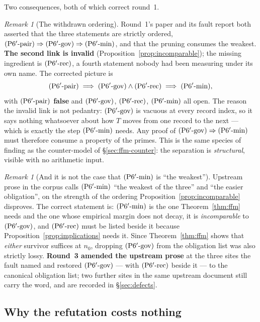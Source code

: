 \documentclass[11pt,a4paper]{article}
\theoremstyle{plain}
\theoremstyle{definition}
\theoremstyle{remark}
\newtheorem{remark}[theorem]{Remark}
\newcommand{\Ppair}{\textup{(P6$'$-pair)}}
\newcommand{\Pgov}{\textup{(P6$'$-gov)}}
\newcommand{\Pmin}{\textup{(P6$'$-min)}}
\newcommand{\Prec}{\textup{(P6$'$-rec)}}
\begin{document}
Two consequences, both of which correct round~1.

\begin{remark}[The withdrawn ordering]
\label{rem:withdrawn}
Round~1's paper and its fault report both asserted that the three statements are strictly
ordered, $\Ppair \Rightarrow \Pgov \Rightarrow \Pmin$, and that the pruning consumes the
weakest. \textbf{The second link is invalid} (Proposition~\ref{prop:incomparable}); the
missing ingredient is $\Prec$, a fourth statement nobody had been measuring under its own
name. The corrected picture is
\[
\Ppair \;\Longrightarrow\; \Pgov \wedge \Prec \;\Longrightarrow\; \Pmin ,
\]
with $\Ppair$ \textbf{false} and $\Pgov$, $\Prec$, $\Pmin$ all open.
The reason the invalid link is not pedantry: $\Pgov$ is vacuous at every record index, so it
says nothing whatsoever about how $T$ moves from one record to the next --- which is exactly
the step $\Pmin$ needs. Any proof of $\Pgov \Rightarrow \Pmin$ must therefore consume a
property of the primes. This is the same species of finding as the counter-model of
\S\ref{sec:ffm-counter}: the separation is \emph{structural}, visible with no arithmetic input.
\end{remark}

\begin{remark}[And it is not the case that $\Pmin$ is ``the weakest'']
\label{rem:notweakest}
Upstream prose in the corpus calls $\Pmin$ ``the weakest of the three'' and ``the easier
obligation'', on the strength of the ordering Proposition~\ref{prop:incomparable} disproves.
The correct statement is: $\Pmin$ is the one Theorem~\ref{thm:ffm} needs and the one whose
empirical margin does not decay, it is \emph{incomparable} to $\Pgov$, and $\Prec$ must be
listed beside it because Proposition~\ref{prop:implications} needs it. Since
Theorem~\ref{thm:ffm} shows that \emph{either} survivor suffices at $n_0$, dropping $\Pgov$
from the obligation list was also strictly lossy. \textbf{Round~3 amended the upstream prose}
at the three sites the fault named and restored $\Pgov$ --- with $\Prec$ beside it --- to the
canonical obligation list; two further sites in the same upstream document still carry the
word, and are recorded in \S\ref{sec:defects}.
\end{remark}

\subsection{Why the refutation costs nothing}
\end{document}
